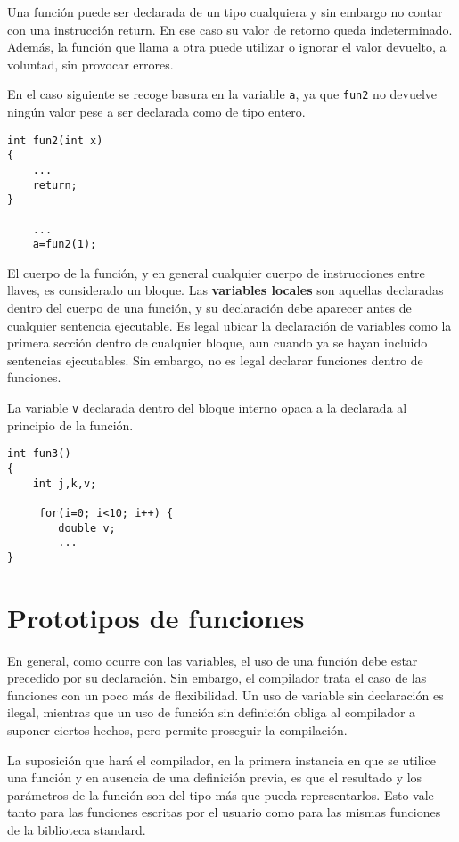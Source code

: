 Una función puede ser declarada de un tipo cualquiera y sin embargo no contar
con una instrucción return. En ese caso su valor de retorno queda
indeterminado. Además, la función que llama a otra puede utilizar o ignorar el
valor devuelto, a voluntad, sin provocar errores.

\begin{ejemplo}
En el caso siguiente se recoge basura en la variable \lstinline{a}, ya que \lstinline{fun2} no devuelve
ningún valor pese a ser declarada como de tipo entero.
\begin{lstlisting}
int fun2(int x)
{
    ...
    return;
}

    ...
    a=fun2(1);
\end{lstlisting}
\end{ejemplo}


El cuerpo de la función, y en general cualquier cuerpo de instrucciones entre
llaves, es considerado un bloque. Las \textbf{variables locales} son aquellas declaradas
dentro del cuerpo de una función, y su declaración debe aparecer antes de
cualquier sentencia ejecutable. Es legal ubicar la declaración de variables
como la primera sección dentro de cualquier bloque, aun cuando ya se hayan
incluido sentencias ejecutables. Sin embargo, no es legal declarar funciones
dentro de funciones. 

\begin{ejemplo}
La variable \lstinline{v} declarada dentro del bloque
interno opaca a la declarada al principio de la función.
\begin{lstlisting}
int fun3()
{
    int j,k,v;

     for(i=0; i<10; i++) {
        double v;
        ...
}
\end{lstlisting}
\end{ejemplo}

	

\section{Prototipos de funciones}
En general, como ocurre con las variables, el uso de una función debe estar
precedido por su declaración. Sin embargo, el compilador trata el caso de las
funciones con un poco más de flexibilidad. Un uso de variable sin declaración
es ilegal, mientras que un uso de función sin definición obliga al compilador a
suponer ciertos hechos, pero permite proseguir la compilación.

La suposición que hará el compilador, en la primera instancia en que se utilice
una función y en ausencia de una definición previa, es que el resultado y los
parámetros de la función son del tipo más  que pueda representarlos.
Esto vale tanto para las funciones escritas por el usuario como para las mismas
funciones de la biblioteca standard. 

